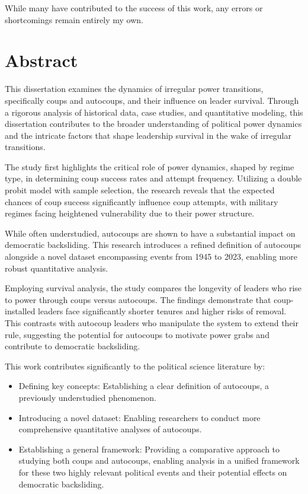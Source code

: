 \documentclass[
  12pt,
]{report}
\begin{document}
While many have contributed to the success of this work, any errors or
shortcomings remain entirely my own.

\chapter*{Abstract}\label{abstract}

This dissertation examines the dynamics of irregular power transitions,
specifically coups and autocoups, and their influence on leader
survival. Through a rigorous analysis of historical data, case studies,
and quantitative modeling, this dissertation contributes to the broader
understanding of political power dynamics and the intricate factors that
shape leadership survival in the wake of irregular transitions.

The study first highlights the critical role of power dynamics, shaped
by regime type, in determining coup success rates and attempt frequency.
Utilizing a double probit model with sample selection, the research
reveals that the expected chances of coup success significantly
influence coup attempts, with military regimes facing heightened
vulnerability due to their power structure.

While often understudied, autocoups are shown to have a substantial
impact on democratic backsliding. This research introduces a refined
definition of autocoups alongside a novel dataset encompassing events
from 1945 to 2023, enabling more robust quantitative analysis.

Employing survival analysis, the study compares the longevity of leaders
who rise to power through coups versus autocoups. The findings
demonstrate that coup-installed leaders face significantly shorter
tenures and higher risks of removal. This contrasts with autocoup
leaders who manipulate the system to extend their rule, suggesting the
potential for autocoups to motivate power grabs and contribute to
democratic backsliding.

This work contributes significantly to the political science literature
by:

\begin{itemize}
\item
  Defining key concepts: Establishing a clear definition of autocoups, a
  previously understudied phenomenon.
\item
  Introducing a novel dataset: Enabling researchers to conduct more
  comprehensive quantitative analyses of autocoups.
\item
  Establishing a general framework: Providing a comparative approach to
  studying both coups and autocoups, enabling analysis in a unified
  framework for these two highly relevant political events and their
  potential effects on democratic backsliding.
\end{itemize}
\end{document}
